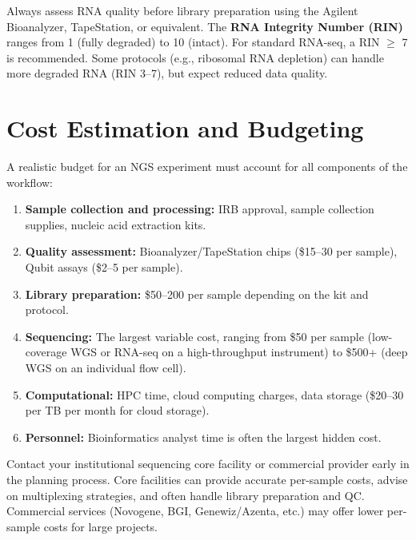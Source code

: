 \begin{tipbox}[title={RNA Quality Assessment}]
Always assess RNA quality before library preparation using the Agilent Bioanalyzer, TapeStation, or equivalent. The \textbf{RNA Integrity Number (RIN)} ranges from 1 (fully degraded) to 10 (intact). For standard RNA-seq, a RIN $\geq$ 7 is recommended. Some protocols (e.g., ribosomal RNA depletion) can handle more degraded RNA (RIN 3--7), but expect reduced data quality.
\end{tipbox}

\section{Cost Estimation and Budgeting}
\label{sec:expdesign:cost}

A realistic budget for an NGS experiment must account for all components of the workflow:

\begin{enumerate}[itemsep=2pt]
  \item \textbf{Sample collection and processing:} IRB approval, sample collection supplies, nucleic acid extraction kits.
  \item \textbf{Quality assessment:} Bioanalyzer/TapeStation chips (\$15--30 per sample), Qubit assays (\$2--5 per sample).
  \item \textbf{Library preparation:} \$50--200 per sample depending on the kit and protocol.
  \item \textbf{Sequencing:} The largest variable cost, ranging from \$50 per sample (low-coverage WGS or RNA-seq on a high-throughput instrument) to \$500+ (deep WGS on an individual flow cell).
  \item \textbf{Computational:} HPC time, cloud computing charges, data storage (\$20--30 per TB per month for cloud storage).
  \item \textbf{Personnel:} Bioinformatics analyst time is often the largest hidden cost.
\end{enumerate}

\begin{tipbox}[title={Get Core Facility Quotes}]
Contact your institutional sequencing core facility or commercial provider early in the planning process. Core facilities can provide accurate per-sample costs, advise on multiplexing strategies, and often handle library preparation and QC. Commercial services (Novogene, BGI, Genewiz/Azenta, etc.) may offer lower per-sample costs for large projects.
\end{tipbox}

